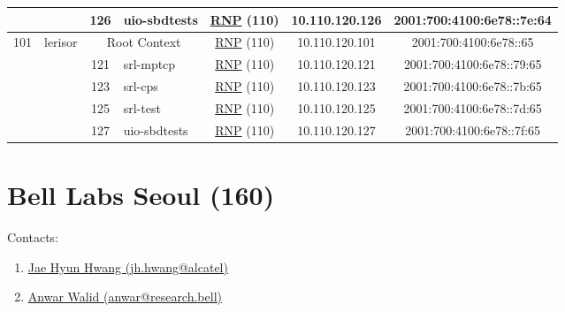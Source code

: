 \begin{small}
\begin{center}
\begin{longtable}{|c|c|c|c|c|c|c|c|}
  &  & \tiny{126} & \multicolumn{1}{|l|}{\tiny{uio-sbdtests}} & \multicolumn{2}{|c|}{\tiny{\href{https://www.rnp.br}{RNP} (110)}} & \tiny{10.110.120.126} & \tiny{2001:700:4100:6e78::7e:64} \\ \hline
 \multirow{5}{*}{\tiny{101}} & \multicolumn{1}{|l|}{\multirow{5}{*}{\tiny{lerisor}}} & \multicolumn{2}{|c|}{\tiny{Root Context}} & \multicolumn{2}{|c|}{\tiny{\href{https://www.rnp.br}{RNP} (110)}} & \tiny{10.110.120.101} & \tiny{2001:700:4100:6e78::65} \\* \cline{3-3}\cline{4-4}\cline{5-5}\cline{6-6}\cline{7-7}\cline{8-8}
  &  & \tiny{121} & \multicolumn{1}{|l|}{\tiny{srl-mptcp}} & \multicolumn{2}{|c|}{\tiny{\href{https://www.rnp.br}{RNP} (110)}} & \tiny{10.110.120.121} & \tiny{2001:700:4100:6e78::79:65} \\* \cline{3-3}\cline{4-4}\cline{5-5}\cline{6-6}\cline{7-7}\cline{8-8}
  &  & \tiny{123} & \multicolumn{1}{|l|}{\tiny{srl-cps}} & \multicolumn{2}{|c|}{\tiny{\href{https://www.rnp.br}{RNP} (110)}} & \tiny{10.110.120.123} & \tiny{2001:700:4100:6e78::7b:65} \\* \cline{3-3}\cline{4-4}\cline{5-5}\cline{6-6}\cline{7-7}\cline{8-8}
  &  & \tiny{125} & \multicolumn{1}{|l|}{\tiny{srl-test}} & \multicolumn{2}{|c|}{\tiny{\href{https://www.rnp.br}{RNP} (110)}} & \tiny{10.110.120.125} & \tiny{2001:700:4100:6e78::7d:65} \\* \cline{3-3}\cline{4-4}\cline{5-5}\cline{6-6}\cline{7-7}\cline{8-8}
  &  & \tiny{127} & \multicolumn{1}{|l|}{\tiny{uio-sbdtests}} & \multicolumn{2}{|c|}{\tiny{\href{https://www.rnp.br}{RNP} (110)}} & \tiny{10.110.120.127} & \tiny{2001:700:4100:6e78::7f:65} \\ \hline
\end{longtable}
\end{center}
\end{small}



\section{Bell Labs Seoul (160)}
\label{sec:BLS}

Contacts:
\begin{enumerate}
 \item {}\href{mailto:jh.hwang@alcatel}{Jae Hyun Hwang (jh.hwang@alcatel)}
 \item {}\href{mailto:anwar@research.bell}{Anwar Walid (anwar@research.bell)}
\end{enumerate}

